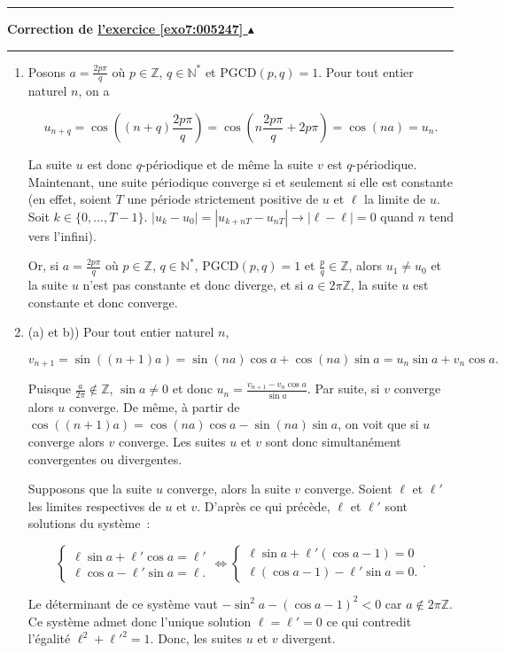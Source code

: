\documentclass[11pt,a4paper]{article}
\newcommand{\Nn}{\mathbb{N}} \newcommand{\N}{\mathbb{N}}
\newcommand{\Zz}{\mathbb{Z}} \newcommand{\Z}{\mathbb{Z}}
\newcounter{exo}
\newcommand{\correction}[1]{\hypertarget{cor7:#1}{}\label{cor7:#1}{\bf Correction de \hyperlink{exo7:#1}{l'exercice \ref{exo7:#1} $\blacktriangle$}}\vspace{1mm}\hrule\vspace{1mm}}
\newcommand{\fincorrection}{\vspace{1mm}\hrule\vspace*{7mm}}
\begin{document}
\fincorrection
\correction{005247}
\begin{enumerate}
\item  Posons $a=\frac{2p\pi}{q}$ où $p\in\Zz$, $q\in\Nn^*$ et $\mbox{PGCD}(p,q)=1$. Pour tout entier naturel $n$, on a

$$u_{n+q}=\cos\left((n+q)\frac{2p\pi}{q}\right)=\cos\left(n\frac{2p\pi}{q}+2p\pi\right)=\cos(na)=u_n.$$

La suite $u$ est donc $q$-périodique et de même la suite $v$ est $q$-périodique. Maintenant, une suite périodique converge si et seulement si elle est constante (en effet, soient $T$ une période strictement positive de $u$ et $\ell$ la limite de $u$. Soit $k\in\{0,...,T-1\}$. $|u_k-u_0|=|u_{k+nT}-u_{nT}|\rightarrow|\ell-\ell|=0$ quand $n$ tend vers l'infini).

Or, si $a=\frac{2p\pi}{q}$ où $p\in\Zz$, $q\in\Nn^*$, $\mbox{PGCD}(p,q)=1$ et $\frac{p}{q}\in\Zz$, alors $u_1\neq u_0$ et la suite $u$ n'est pas constante et donc diverge, et si $a\in2\pi\Zz$, la suite $u$ est constante et donc converge.

\item  (a) et b)) Pour tout entier naturel $n$, 

$$v_{n+1}=\sin((n+1)a)=\sin(na)\cos a+\cos(na)\sin a=u_n\sin a+v_n\cos a.$$

Puisque $\frac{a}{2\pi}\notin\Zz$, $\sin a\neq0$ et donc $u_n=\frac{v_{n+1}-v_n\cos a}{\sin a}$. Par suite, si $v$ converge alors $u$ converge. De même, à partir de $\cos((n+1)a)=\cos(na)\cos a-\sin(na)\sin a$, on voit que si $u$ converge alors $v$ converge. Les suites $u$ et $v$ sont donc simultanément convergentes ou divergentes.

Supposons que la suite $u$ converge, alors la suite $v$ converge. Soient $\ell$ et $\ell'$ les limites respectives de $u$ et $v$. D'après ce qui précède, $\ell$ et $\ell'$ sont solutions du système~:
 
$$\left\{
\begin{array}{l}
\ell\sin a+\ell'\cos a=\ell'\\
\ell\cos a-\ell'\sin a=\ell.
\end{array}
\right.\Leftrightarrow\left\{
\begin{array}{l}
\ell\sin a+\ell'(\cos a-1)=0\\
\ell(\cos a-1)-\ell'\sin a=0.
\end{array}
\right..$$

Le déterminant de ce système vaut $-\sin^2a-(\cos a-1)^2<0$ car $a\notin2\pi\Zz$. Ce système admet donc l'unique solution $\ell=\ell'=0$ ce qui contredit l'égalité $\ell^2+{\ell'}^2=1$. Donc, les suites $u$ et $v$ divergent.


\end{enumerate}
\end{document}
